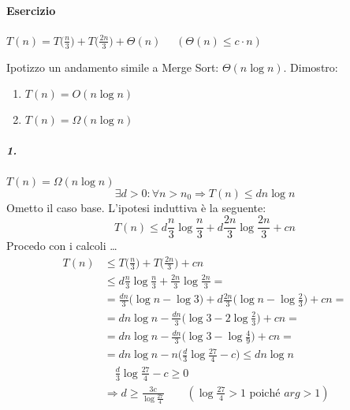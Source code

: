 \paragraph{Esercizio} $T(n) = T\big(\frac{n}{3} \big) + T\big(\frac{2n}{3} \big) + \Theta (n)$
$\quad (\Theta (n) \leq c \cdot n)$\par
Ipotizzo un andamento simile a Merge Sort: $\Theta (n \log n)$. Dimostro:  
\begin{enumerate}
	\item $T(n) = O(n \log n)$
	\item $T(n) = \Omega (n \log n)$
\end{enumerate}

\subparagraph{1.} $T(n) = \Omega (n \log n)$
$$\exists d > 0 : \forall n > n_0 \Rightarrow T(n) \leq dn \log n$$
Ometto il caso base. L'ipotesi induttiva è la seguente:
\[ 
	T(n) \leq d \frac{n}{3} \log \frac{n}{3} + d \frac{2n}{3} \log \frac{2n}{3} + cn
\]
Procedo con i calcoli \dots
\begin{align*}
	T(n) & \leq T\Big(\frac{n}{3} \Big) + T\Big(\frac{2n}{3} \Big) + cn \\
	& \leq d \frac{n}{3} \log \frac{n}{3} + \frac{2n}{3} \log \frac{2n}{3} = \\
	& = \frac{dn}{3} \Big(\log n - \log 3 \Big) + d \frac{2n}{3} \Big(\log n - \log \frac{2}{3} \Big) + cn = \\
	& = dn \log n - \frac{dn}{3} \Big( \log 3 - 2 \log \frac{2}{3} \Big) + cn = \\
	& = dn \log n - \frac{dn}{3} \Big( \log 3 - \log \frac{4}{9} \Big) + cn = \\
	& = dn \log n - n \Big( \frac{d}{3} \log \frac{27}{4} - c \Big) \leq dn \log n\\
	& \quad \frac{d}{3} \log \frac{27}{4} - c \geq 0 \\
	& \Rightarrow d \geq \frac{3c}{\log \frac{27}{4}} \qquad (\log \frac{27}{4} > 1 \text{ poiché } arg > 1)
\end{align*}

